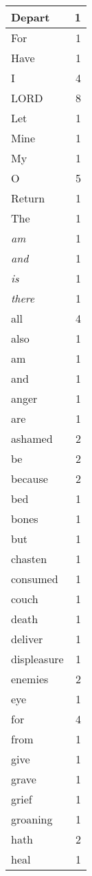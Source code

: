 \begin{center}
\begin{longtable}{l|r}
\hline \hline
\endlastfoot
Depart & 1 \\ \hline
For & 1 \\ \hline
Have & 1 \\ \hline
I & 4 \\ \hline
LORD & 8 \\ \hline
Let & 1 \\ \hline
Mine & 1 \\ \hline
My & 1 \\ \hline
O & 5 \\ \hline
Return & 1 \\ \hline
The & 1 \\ \hline
\emph{am} & 1 \\ \hline
\emph{and} & 1 \\ \hline
\emph{is} & 1 \\ \hline
\emph{there} & 1 \\ \hline
all & 4 \\ \hline
also & 1 \\ \hline
am & 1 \\ \hline
and & 1 \\ \hline
anger & 1 \\ \hline
are & 1 \\ \hline
ashamed & 2 \\ \hline
be & 2 \\ \hline
because & 2 \\ \hline
bed & 1 \\ \hline
bones & 1 \\ \hline
but & 1 \\ \hline
chasten & 1 \\ \hline
consumed & 1 \\ \hline
couch & 1 \\ \hline
death & 1 \\ \hline
deliver & 1 \\ \hline
displeasure & 1 \\ \hline
enemies & 2 \\ \hline
eye & 1 \\ \hline
for & 4 \\ \hline
from & 1 \\ \hline
give & 1 \\ \hline
grave & 1 \\ \hline
grief & 1 \\ \hline
groaning & 1 \\ \hline
hath & 2 \\ \hline
heal & 1 \\ \hline

\end{longtable}
\end{center}
